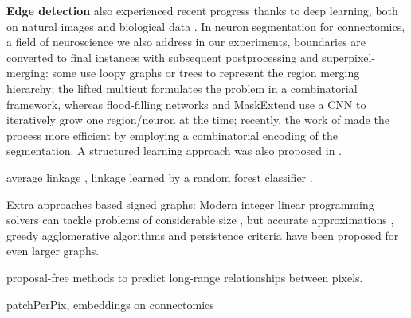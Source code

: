 \textbf{Edge detection} also experienced recent progress thanks to deep learning, both on natural images \cite{Gao_2019_ICCV,liu2018affinity,xie2015holistically,kokkinos2015pushing} and biological data \cite{lee2017superhuman,schmidt2018cell,meirovitch2016multi,ciresan2012deep}. In neuron segmentation for connectomics, a field of neuroscience we also address in our experiments, boundaries are converted to final instances with subsequent postprocessing and superpixel-merging:
some use loopy graphs \cite{kaynig2015large,krasowski2015improving} or trees \cite{meirovitch2016multi,liu2016sshmt,liu2014modular,funke2015learning,uzunbas2016efficient} to represent the region merging hierarchy; the lifted multicut \cite{beier2017multicut} formulates the problem in a combinatorial framework, whereas 
flood-filling networks \cite{januszewski2018high} and MaskExtend \cite{meirovitch2016multi} use a CNN to iteratively grow one region/neuron at the time; recently, the work of \cite{meirovitch2019cross} made the process more efficient by employing a combinatorial encoding of the segmentation.
A structured learning approach was also proposed in \cite{funke2018large,turaga2009maximin}.

\TODO{}
 average linkage \cite{liu2018affinity,lee2017superhuman}, linkage learned by a random forest classifier \cite{nunez2013machine,knowles2016rhoananet}.


Extra approaches based signed graphs: Modern integer linear programming solvers can tackle problems of considerable size \cite{andres2012globally}, but accurate approximations \cite{pape2017solving,beier2016efficient,yarkony2012fast}, greedy agglomerative algorithms \cite{levinkov2017comparative,wolf2019mutex,keuper2015efficient,kardoostsolving} and persistence criteria \cite{lange2018partial,lange2018combinatorial} have been proposed for even larger graphs. 


proposal-free methods \cite{liu2018affinity,wolf2018mutex,lee2017superhuman} to predict long-range relationships between pixels.

\TODO{} patchPerPix, embeddings on connectomics
